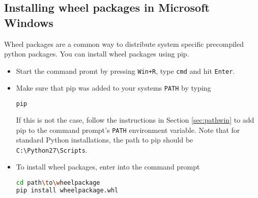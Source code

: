 \documentclass[a4paper,11pt]{article}
\begin{document}
\subsection{Installing wheel packages in Microsoft Windows}
\label{sec:wheel}
Wheel packages are a common way to distribute system specific precompiled python packages. You can install wheel packages using pip. 
\begin{itemize}
\item Start the command promt by pressing \verb#Win+R#, type  \verb+cmd+ and hit \verb+Enter+.
\item  Make sure that pip was added to your systems \verb+PATH+ by typing
 \begin{lstlisting}[frame=single,language=bash]  
  pip
 \end{lstlisting}
If this is not the case, follow the instructions in Section \ref{sec:pathwin} to add pip to the command prompt's \verb+PATH+ environment variable. Note that for standard Python installations, the path to pip should be \verb+C:\Python27\Scripts+.
\item To install wheel packages, enter into the command prompt
\begin{lstlisting}[frame=single,language=bash]  
cd path\to\wheelpackage
pip install wheelpackage.whl
  \end{lstlisting}
\end{itemize}
\end{document}
